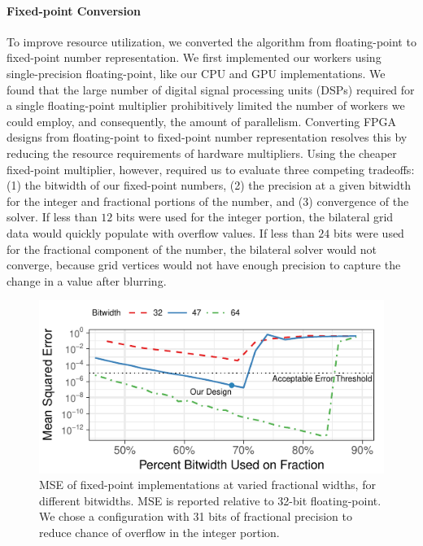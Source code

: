 \paragraph{Fixed-point Conversion} To improve resource utilization, we converted the algorithm from floating-point to fixed-point number representation.
We first implemented our workers using single-precision floating-point, like our CPU and GPU implementations.
We found that the large number of digital signal processing units (DSPs) required for a single floating-point multiplier prohibitively limited the number of workers we could employ, and consequently, the amount of parallelism.
Converting FPGA designs from floating-point to fixed-point number representation resolves this by reducing the resource requirements of hardware multipliers.
Using the cheaper fixed-point multiplier, however, required us to evaluate three competing tradeoffs: (1) the bitwidth of our fixed-point numbers, (2) the precision at a given bitwidth for the integer and fractional portions of the number, and (3) convergence of the solver.
If less than $12$ bits were used for the integer portion, the bilateral grid data would quickly populate with overflow values.
If less than $24$ bits were used for the fractional component of the number, the bilateral solver would not converge, because grid vertices would not have enough precision to capture the change in a value after blurring.

\begin{figure}
  \centering
  \includegraphics[width=\columnwidth]{hfbs-figs/fixed_point.pdf}
  \caption{MSE of fixed-point implementations at varied fractional widths, for different bitwidths. MSE is reported relative to 32-bit floating-point. We chose a configuration with 31 bits of fractional precision to reduce chance of overflow in the integer portion.}
  \label{fig:fixed-point}
\end{figure}

